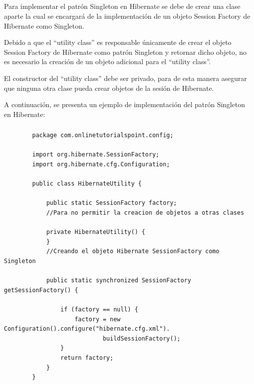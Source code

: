\documentclass[10pt,a4paper]{article} %
\begin{document}
\subsection{}
{\large Para implementar el patr{\' o}n Singleton en Hibernate se debe de crear una clase aparte la cual se encargar{\' a} de la implementaci{\' o}n de un objeto Session Factory de Hibernate como Singleton. 


\vspace{0.5cm}
Debido a que el ``utility class'' es responsable {\' u}nicamente de crear el objeto Session Factory de Hibernate como patr{\' o}n Singleton y retornar dicho objeto, no es necesario la creaci{\' o}n de un objeto adicional para el ``utility class''. 


\vspace{0.5cm}
El constructor del  ``utility class'' debe ser privado, para de esta manera asegurar que ninguna otra clase pueda crear objetos de la sesi{\' o}n de Hibernate.


\vspace{0.5cm}
A continuaci{\' o}n, se presenta un ejemplo de implementaci{\' o}n del patr{\' o}n Singleton en Hibernate:}

\subsubsection{\color{colorESCOM}{HibernateUtility.java}}

    \begin{lstlisting}
        package com.onlinetutorialspoint.config;

        import org.hibernate.SessionFactory;
        import org.hibernate.cfg.Configuration;
        
        public class HibernateUtility {
        
            public static SessionFactory factory;
            //Para no permitir la creacion de objetos a otras clases
        
            private HibernateUtility() {
            }
            //Creando el objeto Hibernate SessionFactory como Singleton
        
            public static synchronized SessionFactory getSessionFactory() {
        
                if (factory == null) {
                    factory = new Configuration().configure("hibernate.cfg.xml").
                            buildSessionFactory();
                }
                return factory;
            }
        }
    \end{lstlisting} 
\end{document}
